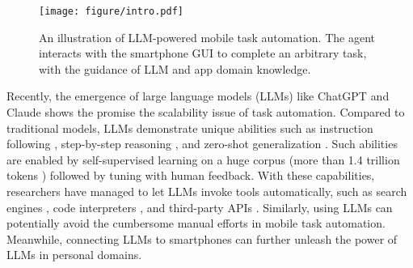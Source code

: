 \begin{figure}
    \centering
    \texttt{[image: figure/intro.pdf]}
    \caption{An illustration of LLM-powered mobile task automation. 
    The agent interacts with the smartphone GUI to complete an arbitrary task, with the guidance of LLM and app domain knowledge.}%
    \label{fig:intro}
    \vspace{-0.5cm}
\end{figure}

Recently, the emergence of large language models (LLMs) like ChatGPT \cite{chatgpt} and Claude \cite{claude} shows the promise  the scalability issue of task automation.
Compared to traditional models, LLMs demonstrate unique abilities such as instruction following \cite{alpaca}, step-by-step reasoning \cite{cot}, and zero-shot generalization \cite{zero-shot-cot}.
Such abilities are enabled by self-supervised learning on a huge corpus (more than 1.4 trillion tokens \cite{touvron2023llama}) followed by tuning with human feedback.
With these capabilities, researchers have managed to let LLMs invoke tools automatically, such as search engines \cite{webgpt}, code interpreters \cite{copilot}, and third-party APIs \cite{gorilla, chamelon}. 
Similarly, using LLMs can potentially avoid the cumbersome manual efforts in mobile task automation. Meanwhile, connecting LLMs to smartphones can further unleash the power of LLMs in personal domains.

